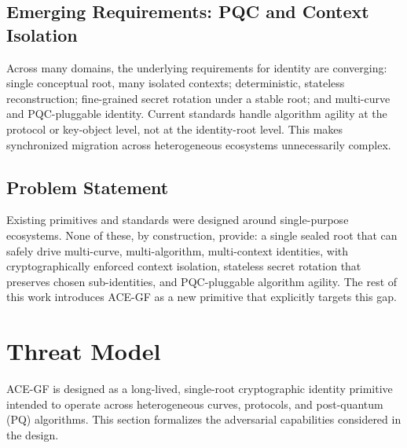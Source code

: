 \documentclass[11pt,a4paper]{article}
\begin{document}
\subsection{Emerging Requirements: PQC and Context Isolation}
Across many domains, the underlying requirements for identity are converging: single conceptual root, many isolated contexts; deterministic, stateless reconstruction; fine-grained secret rotation under a stable root; and multi-curve and PQC-pluggable identity. Current standards handle algorithm agility at the protocol or key-object level, not at the identity-root level. This makes synchronized migration across heterogeneous ecosystems unnecessarily complex.

\subsection{Problem Statement}
Existing primitives and standards were designed around single-purpose ecosystems. None of these, by construction, provide: a single sealed root that can safely drive multi-curve, multi-algorithm, multi-context identities, with cryptographically enforced context isolation, stateless secret rotation that preserves chosen sub-identities, and PQC-pluggable algorithm agility. The rest of this work introduces ACE-GF as a new primitive that explicitly targets this gap.

\section{Threat Model}
ACE-GF is designed as a long-lived, single-root cryptographic identity primitive intended to operate across heterogeneous curves, protocols, and post-quantum (PQ) algorithms. This section formalizes the adversarial capabilities considered in the design.
\end{document}
